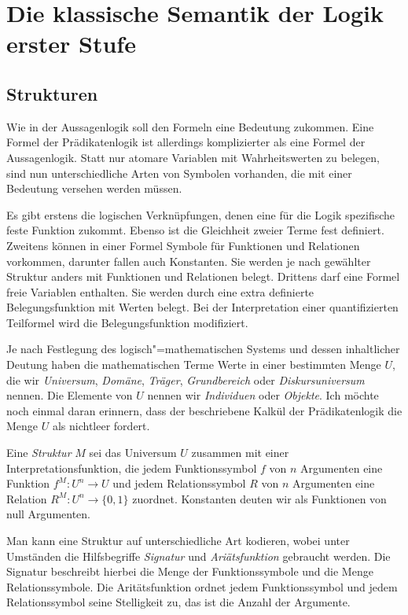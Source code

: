 \section{Die klassische Semantik der Logik erster Stufe}

\subsection{Strukturen}

Wie in der Aussagenlogik soll den Formeln eine Bedeutung zukommen.
Eine Formel der Prädikatenlogik ist allerdings komplizierter als eine
Formel der Aussagenlogik. Statt nur atomare Variablen mit
Wahrheitswerten zu belegen, sind nun unterschiedliche Arten von
Symbolen vorhanden, die mit einer Bedeutung versehen werden müssen.

Es gibt erstens die logischen Verknüpfungen, denen eine für die
Logik spezifische feste Funktion zukommt. Ebenso ist die Gleichheit
zweier Terme fest definiert. Zweitens können in einer Formel Symbole
für Funktionen und Relationen vorkommen, darunter fallen auch
Konstanten. Sie werden je nach gewählter Struktur anders mit
Funktionen und Relationen belegt. Drittens darf eine Formel
freie Variablen enthalten. Sie werden durch eine extra definierte
Belegungsfunktion mit Werten belegt. Bei der Interpretation einer
quantifizierten Teilformel wird die Belegungsfunktion modifiziert.

Je nach Festlegung des logisch"=mathematischen Systems und dessen
inhaltlicher Deutung haben die mathematischen Terme Werte
in einer bestimmten Menge $U$, die wir \emph{Universum},
\emph{Domäne}, \emph{Träger}, \emph{Grundbereich} oder
\emph{Diskursuniversum} nennen.  Die Elemente von $U$ nennen wir
\emph{Individuen} oder \emph{Objekte}. Ich möchte noch einmal daran
erinnern, dass der beschriebene Kalkül der Prädikatenlogik die
Menge $U$ als nichtleer fordert.

Eine \emph{Struktur} $M$ sei das Universum $U$ zusammen mit einer
Interpretationsfunktion, die jedem Funktionssymbol $f$ von $n$ Argumenten
eine Funktion $f^M\colon U^n \to U$ und jedem Relationssymbol $R$ von
$n$ Argumenten eine Relation $R^M\colon U^n\to\{0,1\}$ zuordnet.
Konstanten deuten wir als Funktionen von null Argumenten.

Man kann eine Struktur auf unterschiedliche Art kodieren, wobei
unter Umständen die Hilfsbegriffe \emph{Signatur} und
\emph{Ariätsfunktion} gebraucht werden. Die Signatur beschreibt hierbei
die Menge der Funktionssymbole und die Menge Relationssymbole. Die
Aritätsfunktion ordnet jedem Funktionssymbol und jedem Relationssymbol
seine Stelligkeit zu, das ist die Anzahl der Argumente.


